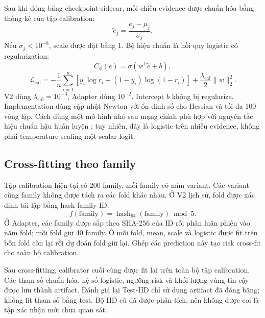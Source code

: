 Sau khi đóng băng checkpoint sidecar, mỗi chiều evidence được
chuẩn hóa bằng thống kê của tập calibration:
\begin{equation}
    \widetilde{e}_j=\frac{e_j-\mu_j}{\sigma_j}.
\end{equation}
Nếu $\sigma_j<10^{-8}$, scale được đặt bằng 1.
Bộ hiệu chuẩn là hồi quy logistic có regularization:
\begin{equation}
    C_\phi(e)=\sigma(w^{\mathsf T}\widetilde{e}+b),
    \label{eq:method-logistic}
\end{equation}
\begin{equation}
    \mathcal{L}_{\mathrm{cal}}=
    -\frac{1}{n}\sum_{i=1}^{n}
    \left[y_i\log r_i+(1-y_i)\log(1-r_i)\right]
    +\frac{\lambda_{\mathrm{cal}}}{2}\|w\|_2^2.
\end{equation}
V2 dùng $\lambda_{\mathrm{cal}}=10^{-3}$, Adapter dùng $10^{-2}$. Intercept $b$ không bị regularize. Implementation dùng cập nhật
Newton với ổn định số cho Hessian và tối đa 100 vòng lặp.
Cách dùng một mô hình nhỏ sau mạng chính phù hợp với nguyên tắc
hiệu chuẩn hậu huấn luyện \cite{niculescu2005probabilities,guo2017calibration};
tuy nhiên, đây là logistic trên nhiều evidence, không phải
temperature scaling một scalar logit.

\subsection{Cross-fitting theo family}

Tập calibration hiện tại có 200 family, mỗi family có năm variant.
Các variant cùng family không được tách ra các fold khác nhau.
Ở V2 lịch sử, fold được xác định tái lập bằng hash family ID:
\begin{equation}
    f(\mathrm{family})=
    \operatorname{hash}_{64}(\mathrm{family})\bmod5.
\end{equation}
Ở Adapter, các family được sắp theo SHA-256 của ID rồi phân luân phiên vào năm fold; mỗi fold giữ 40 family. Ở mỗi fold, mean, scale và logistic được fit trên bốn fold còn
lại rồi dự đoán fold giữ lại. Ghép các prediction này tạo risk
cross-fit cho toàn bộ calibration.

Sau cross-fitting, calibrator cuối cùng được fit lại trên toàn
bộ tập calibration. Các tham số chuẩn hóa, hệ số logistic,
ngưỡng risk và khối lượng vùng tin cậy được lưu thành artifact.
Đánh giá lại Test-IID chỉ sử dụng artifact đã đóng băng; không fit tham số bằng test. Bộ IID cũ đã được phân tích, nên không được coi là tập xác nhận mới chưa quan sát.

